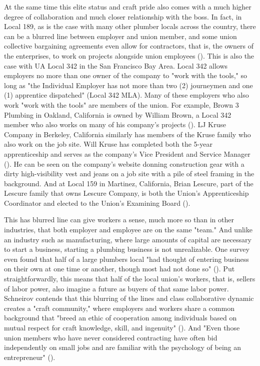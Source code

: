 \documentclass[12pt]{article}
\begin{document}
At the same time this elite status and craft pride also comes with a much higher degree of collaboration and much closer relationship with the boss. In fact, in Local 189, as is the case with many other plumber locals across the country, there can be a blurred line between employer and union member, and some union collective bargaining agreements even allow for contractors, that is, the owners of the enterprises, to work on projects alongside union employees (\cite[5]{schneirovPrideSolidarityHistory1993}). This is also the case with UA Local 342 in the San Francisco Bay Area. Local 342 allows employers no more than one owner of the company to "work with the tools," so long as "the Individual Employer has not more than two (2) journeymen and one (1) apprentice dispatched" (Local 342 MLA). Many of these employers who also work "work with the tools" are members of the union. For example, Brown 3 Plumbing in Oakland, California is owned by William Brown, a Local 342 member who also works on many of his company’s projects (\cite{brownplumbingExecutiveSummary}). LJ Kruse Company in Berkeley, California similarly has members of the Kruse family who also work on the job site. Will Kruse has completed both the 5-year apprenticeship and serves as the company’s Vice President and Service Manager (\cite{ljkruseUs}). He can be seen on the company’s website donning construction gear with a dirty high-visibility vest and jeans on a job site with a pile of steel framing in the background. And at Local 159 in Martinez, California, Brian Lescure, part of the Lescure family that owns Lescure Company, is both the Union’s Apprenticeship Coordinator and elected to the Union’s Examining Board (\cite{lescureLinkedIn}).

This has blurred line can give workers a sense, much more so than in other industries, that both employer and employee are on the same "team." And unlike an industry such as manufacturing, where large amounts of capital are necessary to start a business, starting a plumbing business is not unrealizable. One survey even found that half of a large plumbers local "had thought of entering business on their own at one time or another, though most had not done so" (\cite[5]{schneirovPrideSolidarityHistory1993}). Put straightforwardly, this means that half of the local union’s workers, that is, sellers of labor power, also imagine a future as buyers of that same labor power. Schneirov contends that this blurring of the lines and class collaborative dynamic creates a "craft community," where employers and workers share a common background that "breed an ethic of cooperation among individuals based on mutual respect for craft knowledge, skill, and ingenuity" (\cite[6]{schneirovPrideSolidarityHistory1993}). And "Even those union members who have never considered contracting have often bid independently on small jobs and are familiar with the psychology of being an entrepreneur" (\cite[5--6]{schneirovPrideSolidarityHistory1993}). 
\end{document}

